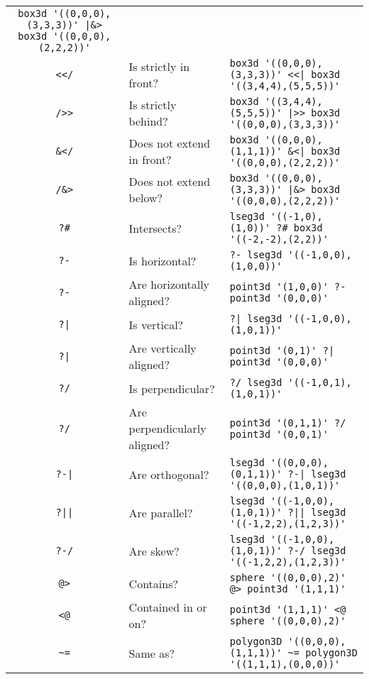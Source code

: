 \documentclass[10pt]{article}
\begin{document}
\begin{landscape}
\begin{center}
\begin{longtable}{|c|l|l|}
	\verb+box3d '((0,0,0),(3,3,3))' |&> box3d '((0,0,0),(2,2,2))'+ \\
\verb+<</+ & Is strictly in front? & 
	\verb+box3d '((0,0,0),(3,3,3))' <<| box3d '((3,4,4),(5,5,5))'+ \\
\verb+/>>+ & Is strictly behind? & 
	\verb+box3d '((3,4,4),(5,5,5))' |>> box3d '((0,0,0),(3,3,3))'+ \\
\verb+&</+ & Does not extend in front? & 
	\verb+box3d '((0,0,0),(1,1,1))' &<| box3d '((0,0,0),(2,2,2))'+ \\
\verb+/&>+ & Does not extend below? & 
	\verb+box3d '((0,0,0),(3,3,3))' |&> box3d '((0,0,0),(2,2,2))'+ \\
\verb+?#+ & Intersects? & 
	\verb+lseg3d '((-1,0),(1,0))' ?# box3d '((-2,-2),(2,2))'+ \\
\verb+?-+ & Is horizontal? & 
	\verb+?- lseg3d '((-1,0,0),(1,0,0))'+ \\
\verb+?-+ & Are horizontally aligned? & 
	\verb+point3d '(1,0,0)' ?- point3d '(0,0,0)'+ \\
\verb+?|+ & Is vertical? & 
	\verb+?| lseg3d '((-1,0,0),(1,0,1))'+ \\
\verb+?|+ & Are vertically aligned? & 
	\verb+point3d '(0,1)' ?| point3d '(0,0,0)'+ \\
\verb+?/+ & Is perpendicular? & 
	\verb+?/ lseg3d '((-1,0,1),(1,0,1))'+ \\
\verb+?/+ & Are perpendicularly aligned? & 
	\verb+point3d '(0,1,1)' ?/ point3d '(0,0,1)'+ \\
\verb+?-|+ & Are orthogonal? & 
	\verb+lseg3d '((0,0,0),(0,1,1))' ?-| lseg3d '((0,0,0),(1,0,1))'+ \\
\verb+?||+ & Are parallel? & 
	\verb+lseg3d '((-1,0,0),(1,0,1))' ?|| lseg3d '((-1,2,2),(1,2,3))'+ \\
\verb+?-/+ & Are skew? & 
	\verb+lseg3d '((-1,0,0),(1,0,1))' ?-/ lseg3d '((-1,2,2),(1,2,3))'+ \\
\verb+@>+ & Contains? & 
	\verb+sphere '((0,0,0),2)' @> point3d '(1,1,1)'+ \\
\verb+<@+ & Contained in or on? & 
	\verb+point3d '(1,1,1)' <@ sphere '((0,0,0),2)'+ \\
\verb+~=+ & Same as? & 
	\verb+polygon3D '((0,0,0),(1,1,1))' ~= polygon3D '((1,1,1),(0,0,0))'+ \\
\end{longtable}
\end{center}



\end{landscape}
\end{document}
